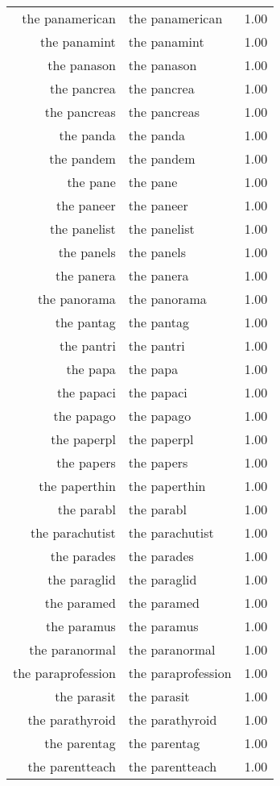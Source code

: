 \begin{table}[ht]
\begin{tabular}{rlr}
  the panamerican & the panamerican & 1.00 \\ 
  the panamint & the panamint & 1.00 \\ 
  the panason & the panason & 1.00 \\ 
  the pancrea & the pancrea & 1.00 \\ 
  the pancreas & the pancreas & 1.00 \\ 
  the panda & the panda & 1.00 \\ 
  the pandem & the pandem & 1.00 \\ 
  the pane & the pane & 1.00 \\ 
  the paneer & the paneer & 1.00 \\ 
  the panelist & the panelist & 1.00 \\ 
  the panels & the panels & 1.00 \\ 
  the panera & the panera & 1.00 \\ 
  the panorama & the panorama & 1.00 \\ 
  the pantag & the pantag & 1.00 \\ 
  the pantri & the pantri & 1.00 \\ 
  the papa & the papa & 1.00 \\ 
  the papaci & the papaci & 1.00 \\ 
  the papago & the papago & 1.00 \\ 
  the paperpl & the paperpl & 1.00 \\ 
  the papers & the papers & 1.00 \\ 
  the paperthin & the paperthin & 1.00 \\ 
  the parabl & the parabl & 1.00 \\ 
  the parachutist & the parachutist & 1.00 \\ 
  the parades & the parades & 1.00 \\ 
  the paraglid & the paraglid & 1.00 \\ 
  the paramed & the paramed & 1.00 \\ 
  the paramus & the paramus & 1.00 \\ 
  the paranormal & the paranormal & 1.00 \\ 
  the paraprofession & the paraprofession & 1.00 \\ 
  the parasit & the parasit & 1.00 \\ 
  the parathyroid & the parathyroid & 1.00 \\ 
  the parentag & the parentag & 1.00 \\ 
  the parentteach & the parentteach & 1.00 \\ 

\end{tabular}
\end{table}
